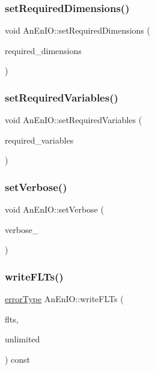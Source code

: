 \subsubsection{\texorpdfstring{set\+Required\+Dimensions()}{setRequiredDimensions()}}
{\footnotesize\ttfamily void An\+En\+I\+O\+::set\+Required\+Dimensions (\begin{DoxyParamCaption}\item[{std\+::vector$<$ std\+::string $>$}]{required\+\_\+dimensions }\end{DoxyParamCaption})}

\mbox{\label{class_an_en_i_o_a643c51c346118d8416fa2c2e0da8042a}} 
\subsubsection{\texorpdfstring{set\+Required\+Variables()}{setRequiredVariables()}}
{\footnotesize\ttfamily void An\+En\+I\+O\+::set\+Required\+Variables (\begin{DoxyParamCaption}\item[{std\+::vector$<$ std\+::string $>$}]{required\+\_\+variables }\end{DoxyParamCaption})}

\mbox{\label{class_an_en_i_o_a696dff7bb250fc45b597e5f82e33e23e}} 
\subsubsection{\texorpdfstring{set\+Verbose()}{setVerbose()}}
{\footnotesize\ttfamily void An\+En\+I\+O\+::set\+Verbose (\begin{DoxyParamCaption}\item[{int}]{verbose\+\_\+ }\end{DoxyParamCaption})}

\mbox{\label{class_an_en_i_o_a150e3fc6fe249b11bac909e5ee843a58}} 
\subsubsection{\texorpdfstring{write\+F\+L\+Ts()}{writeFLTs()}}
{\footnotesize\ttfamily \mbox{\hyperlink{class_an_en_i_o_aa56bc1ec6610b86db4349bce20f9ead0}{error\+Type}} An\+En\+I\+O\+::write\+F\+L\+Ts (\begin{DoxyParamCaption}\item[{const \mbox{\hyperlink{classanen_time_1_1_f_l_ts}{anen\+Time\+::\+F\+L\+Ts}} \&}]{flts,  }\item[{bool}]{unlimited }\end{DoxyParamCaption}) const}

